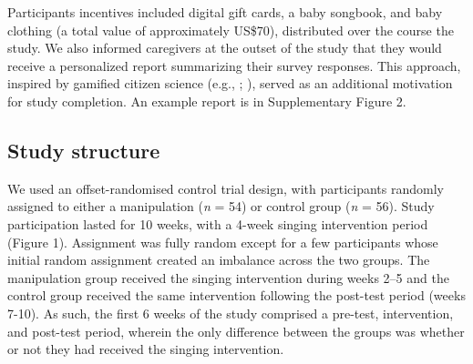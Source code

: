 \documentclass[
]{article}
\begin{document}
Participants incentives included digital gift cards, a baby songbook,
and baby clothing (a total value of approximately US\$70), distributed
over the course the study. We also informed caregivers at the outset of
the study that they would receive a personalized report summarizing
their survey responses. This approach, inspired by gamified citizen
science (e.g., ;
), served as an
additional motivation for study completion. An example report is in
Supplementary Figure 2.

\subsection{Study structure}\label{study-structure}

We used an offset-randomised control trial design, with participants
randomly assigned to either a manipulation (\emph{n} = 54) or control
group (\emph{n} = 56). Study participation lasted for 10 weeks, with a
4-week singing intervention period (Figure 1). Assignment was fully
random except for a few participants whose initial random assignment
created an imbalance across the two groups. The manipulation group
received the singing intervention during weeks 2--5 and the control
group received the same intervention following the post-test period
(weeks 7-10). As such, the first 6 weeks of the study comprised a
pre-test, intervention, and post-test period, wherein the only
difference between the groups was whether or not they had received the
singing intervention.
\end{document}
